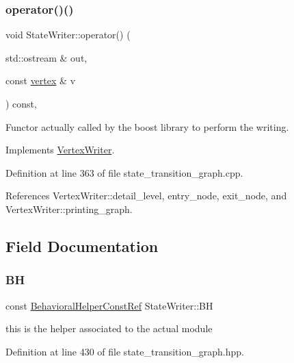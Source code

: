\subsubsection{\texorpdfstring{operator()()}{operator()()}}
{\footnotesize\ttfamily void State\+Writer\+::operator() (\begin{DoxyParamCaption}\item[{std\+::ostream \&}]{out,  }\item[{const \hyperlink{graph_8hpp_abefdcf0544e601805af44eca032cca14}{vertex} \&}]{v }\end{DoxyParamCaption}) const\hspace{0.3cm}{\ttfamily [override]}, {\ttfamily [virtual]}}



Functor actually called by the boost library to perform the writing. 



Implements \hyperlink{classVertexWriter_a9df92a65d6e59d160be56eb8ec5cb84c}{Vertex\+Writer}.



Definition at line 363 of file state\+\_\+transition\+\_\+graph.\+cpp.



References Vertex\+Writer\+::detail\+\_\+level, entry\+\_\+node, exit\+\_\+node, and Vertex\+Writer\+::printing\+\_\+graph.



\subsection{Field Documentation}
\mbox{\label{classStateWriter_a561b71f47ff140e6200425ce70af97da}} 
\subsubsection{\texorpdfstring{BH}{BH}}
{\footnotesize\ttfamily const \hyperlink{behavioral__helper_8hpp_aae973b54cac87eef3b27442aa3e1e425}{Behavioral\+Helper\+Const\+Ref} State\+Writer\+::\+BH\hspace{0.3cm}{\ttfamily [private]}}



this is the helper associated to the actual module 



Definition at line 430 of file state\+\_\+transition\+\_\+graph.\+hpp.

